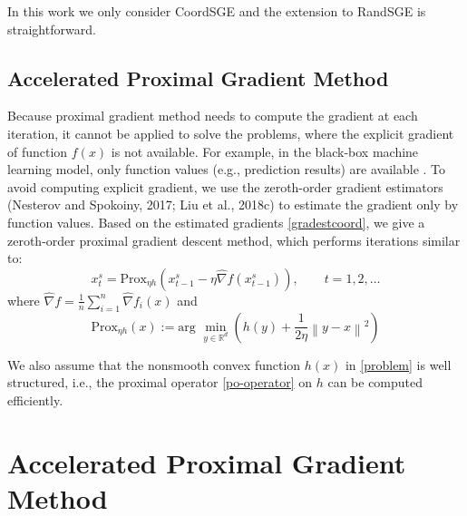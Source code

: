 \documentclass{article}
\newcommand*{\R}{\mathbb{R}}
\newcommand*{\Po}{\text{Prox}}
\newcommand{\norm}[1]{\left\lVert#1\right\rVert}
\theoremstyle{definition}
\theoremstyle{remark}
\begin{document}
{\color{red} In this work we only consider CoordSGE and the extension to RandSGE is straightforward.}

\subsection{Accelerated Proximal Gradient Method}
{\color{Green}
Because proximal gradient method needs to compute
the gradient at each iteration, it cannot be applied to solve the problems, where the explicit gradient of function $f(x)$ is
not available. For example, in the black-box machine learning model, only function values (e.g., prediction results) are
available \cite{chen2017zoo}. To avoid computing explicit gradient, we use the zeroth-order gradient estimators \cite{nesterov2017random,liu2018zeroth}(Nesterov and Spokoiny, 2017; Liu et al., 2018c) to estimate the
gradient only by function values.
Based on the estimated gradients \eqref{gradestcoord}, we give a zeroth-order proximal gradient descent method, which performs  iterations similar to:
\begin{equation}
x_{t}^s= \Po_{\eta h}(x_{t-1}^s - \eta \hat{\nabla} f(x_{t-1}^s)),\qquad t=1, 2, \ldots
\end{equation}
where $\hat{\nabla} f=\frac{1}{n}\sum_{i=1}^n \hat{\nabla} f_i(x)$ and 
\begin{equation}\label{po-operator}
\Po_{\eta h}(x) := \text{arg}\,\,\min_{y\in\R^d}\left(h(y)+\frac{1}{2\eta}\norm{y-x}^2\right)
\end{equation}
}
{\color{Green}


{\color{Violet}
We also assume that the
nonsmooth convex function $h(x)$ in \eqref{problem} is well structured, i.e., the proximal operator \eqref{po-operator} on $h$ can be computed efficiently.

}
}
\section{Accelerated Proximal Gradient Method}
\end{document}
